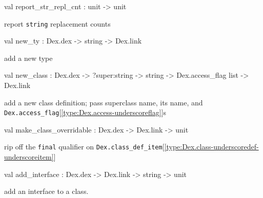 \documentclass[11pt]{article}
\begin{document}
\label{val:Modify.report-underscorestr-underscorerepl-underscorecnt}\begin{ocamldoccode}
val report_str_repl_cnt : unit -> unit
\end{ocamldoccode}
\begin{ocamldocdescription}
report {\tt{string}} replacement counts


\end{ocamldocdescription}




\label{val:Modify.new-underscorety}\begin{ocamldoccode}
val new_ty : Dex.dex -> string -> Dex.link
\end{ocamldoccode}
\begin{ocamldocdescription}
add a new type


\end{ocamldocdescription}




\label{val:Modify.new-underscoreclass}\begin{ocamldoccode}
val new_class :
  Dex.dex -> ?super:string -> string -> Dex.access_flag list -> Dex.link
\end{ocamldoccode}
\begin{ocamldocdescription}
add a new class definition;
 pass superclass name, its name, and {\tt{Dex.access\_flag}}[\ref{type:Dex.access-underscoreflag}]s


\end{ocamldocdescription}




\label{val:Modify.make-underscoreclass-underscoreoverridable}\begin{ocamldoccode}
val make_class_overridable : Dex.dex -> Dex.link -> unit
\end{ocamldoccode}
\begin{ocamldocdescription}
rip off the {\tt{final}} qualifier on {\tt{Dex.class\_def\_item}}[\ref{type:Dex.class-underscoredef-underscoreitem}]


\end{ocamldocdescription}




\label{val:Modify.add-underscoreinterface}\begin{ocamldoccode}
val add_interface : Dex.dex -> Dex.link -> string -> unit
\end{ocamldoccode}
\begin{ocamldocdescription}
add an interface to a class.


\end{ocamldocdescription}
\end{document}
